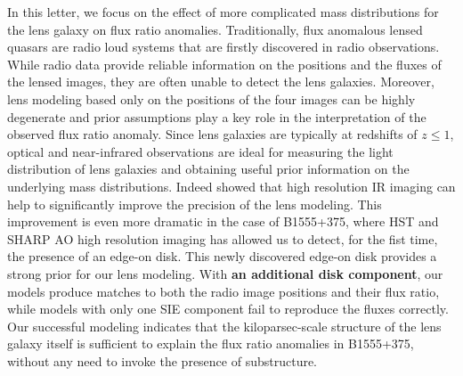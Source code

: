 \documentclass[useAMS,usenatbib]{mn2e}
\begin{document}
In this letter, we focus on the effect of more complicated mass
distributions for the lens galaxy on flux ratio anomalies.
Traditionally, flux anomalous lensed quasars are radio loud systems
that are firstly discovered in radio observations. While radio data
provide reliable information on the positions and the fluxes of the
lensed images, they are often unable to detect the lens
galaxies. Moreover, lens modeling based only on the positions of the
four images can be highly degenerate and prior assumptions play a key
role in the interpretation of the observed flux ratio anomaly.  Since
lens galaxies are typically at redshifts of $z \leq 1$, optical and
near-infrared observations are ideal for measuring the light distribution
of lens galaxies and obtaining useful prior information on the underlying
mass distributions. Indeed \citet{SHARP12} showed that high
resolution IR imaging can help to significantly improve the precision
of the lens modeling. This improvement is even more dramatic in the
case of B1555+375, where HST and SHARP AO high resolution imaging has
allowed us to detect, for the fist time, the presence of an edge-on
disk. This newly discovered edge-on disk provides a strong prior for our
lens modeling.  With \textbf{an additional disk component}, our models produce
matches to both the radio image positions and their flux ratio, while
models with only one SIE component \citep{Marlow99,Xu14} fail to
reproduce the fluxes correctly. Our successful modeling indicates
that the kiloparsec-scale structure of the lens galaxy itself is
sufficient to explain the flux ratio anomalies in B1555+375, without
any need to invoke the presence of substructure.
\end{document}
